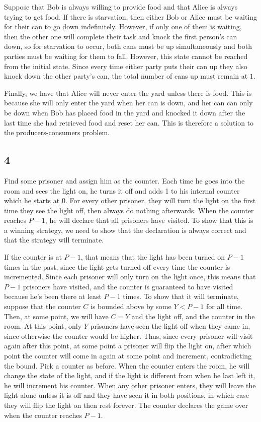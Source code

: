 \documentclass{article}
\begin{document}
Suppose that Bob is always willing to provide food and that Alice is always trying to get food. If there is starvation, then either Bob or Alice must be waiting for their can to go down indefinitely. However, if only one of them is waiting, then the other one will complete their task and knock the first person's can down, so for starvation to occur, both cans must be up simultaneously and both parties must be waiting for them to fall. However, this state cannot be reached from the initial state. Since every time either party puts their can up they also knock down the other party's can, the total number of cans up must remain at $1$.

Finally, we have that Alice will never enter the yard unless there is food. This is because she will only enter the yard when her can is down, and her can can only be down when Bob has placed food in the yard and knocked it down after the last time she had retrieved food and reset her can. This is therefore a solution to the producers-consumers problem.
\subsection*{4}
Find some prisoner and assign him as the counter. Each time he goes into the room and sees the light on, he turns it off and adds 1 to his internal counter which he starts at 0. For every other prisoner, they will turn the light on the first time they see the light off, then always do nothing afterwards. When the counter reaches $P-1$, he will declare that all prisoners have visited. To show that this is a winning strategy, we need to show that the declaration is always correct and that the strategy will terminate. 

If the counter is at $P-1$, that means that the light has been turned on $P-1$ times in the past, since the light gets turned off every time the counter is incremented. Since each prisoner will only turn on the light once, this means that $P-1$ prisoners have visited, and the counter is guaranteed to have visited because he's been there at least $P-1$ times. To show that it will terminate, suppose that the counter $C$ is bounded above by some $Y<P-1$ for all time. Then, at some point, we will have $C=Y$ and the light off, and the counter in the room. At this point, only $Y$ prisoners have seen the light off when they came in, since otherwise the counter would be higher. Thus, since every prisoner will visit again after this point, at some point a prisoner will flip the light on, after which point the counter will come in again at some point and increment, contradicting the bound.
Pick a counter as before. When the counter enters the room, he will change the state of the light, and if the light is different from when he last left it, he will increment his counter. When any other prisoner enters, they will leave the light alone unless it is off and they have seen it in both positions, in which case they will flip the light on then rest forever. The counter declares the game over when the counter reaches $P-1$.
\end{document}
